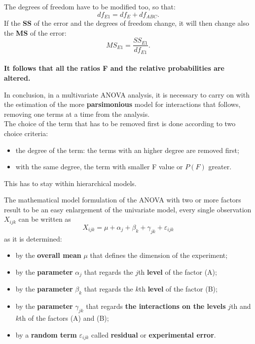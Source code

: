\begin{frame}
  \vspace*{.25cm} 
  The degrees of freedom have to be modified too, so that:
  $$ df_{E1}=df_E+df_{ABC} \mbox{.} $$
  If the \textbf{SS} of the error and the degrees of freedom change, it will then change also the \textbf{MS} of the error:
  $$ MS_{E1}=\frac{SS_{E1}}{df_{E1}} \mbox{.} $$\\
  \vspace*{.5cm}
  \textbf{It follows that all the ratios F and the relative probabilities are altered.}
\end{frame}

\begin{frame}
  \vspace*{.5cm} 
  In conclusion, in a multivariate ANOVA analysis, it is necessary to carry on with the estimation of the more \textbf{parsimonious} model for interactions that follows, removing one terms at a time from the analysis.\\
  \vspace*{.5cm}
  The choice of the term that has to be removed first is done according to two choice criteria:
  \begin{itemize}
    \item the degree of the term: the terms with an higher degree are removed first;
    \item with the same degree, the term with smaller F value or $ P(F) $ greater.
  \end{itemize}
  \vspace*{.5cm}
  This has to stay within hierarchical models.
\end{frame}


\begin{frame}
  \vspace*{.25cm} 
  The mathematical model formulation of the ANOVA with two or more factors result to be an easy enlargement of the univariate model, every single observation {\boldmath $ X_{ijk} $} can be written as
  $$ X_{ijk}=\mu+\alpha_{j}+\beta_{k}+\gamma_{jk}+\varepsilon_{ijk} $$
  as it is determined:
  \begin{itemize}
    \item by the \textbf{overall mean} {\boldmath$\mu$} that defines the dimension of the experiment;
    \item by the \textbf{parameter} {\boldmath$\alpha_{j}$} that regards the $ j $th \textbf{level} of the factor (A);
    \item by the \textbf{parameter} {\boldmath$\beta_{k}$} that regards the  $ k $th \textbf{level} of the factor (B);
    \item by the \textbf{parameter}  {\boldmath$\gamma_{jk}$} that regards \textbf{the interactions on the levels} $ j $th and $ k $th of the factors (A) and (B);
    \item by a \textbf{random term} {\boldmath$\varepsilon_{ijk}$} called \textbf{residual} or \textbf{experimental error}.
   \end{itemize}
\end{frame}

